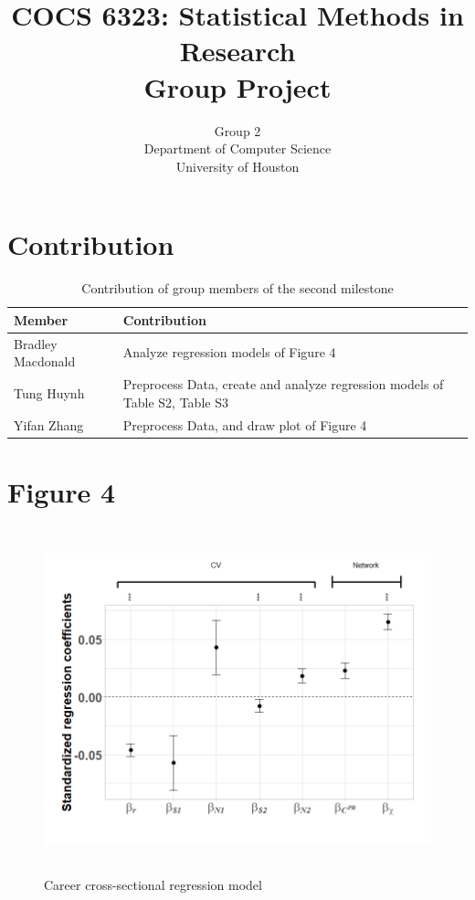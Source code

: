 \documentclass[10pt]{article}          %
\title{COCS 6323: Statistical Methods in Research \\ Group Project} %
\author{Group 2 \\
        Department of Computer Science\\
        University of Houston}         %
\begin{document}



\maketitle              %

\newpage
\tableofcontents        %
\listoftables           %
\listoffigures          %

\newpage
\section{Contribution}
\begin{table}[h]
\begin{tabular}{|p{4cm}|p{13cm}|}
\hline
\textbf{Member} & \textbf{Contribution} \\ \hline
Bradley Macdonald & Analyze regression models of Figure 4\\ \hline
Tung Huynh & Preprocess Data, create and analyze regression models of Table S2, Table S3\\ \hline
Yifan Zhang & Preprocess Data, and draw plot of Figure 4 \\ \hline
\end{tabular}
\caption{Contribution of group members of the second milestone}
\label{tbl:contribution}
\end{table}

\newpage
\section{Figure 4}

\begin{figure}[!htb]
  \centering
  \includegraphics[width=12cm, height=10cm]{Figure4.png}
  \caption{Career cross-sectional regression model}
  \label{Fig4}
\end{figure}
\end{document}
